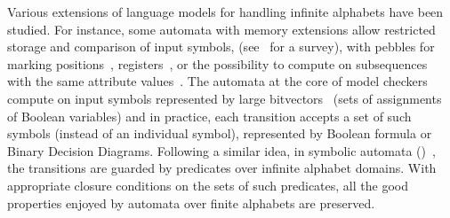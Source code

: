 Various extensions of language models for handling infinite alphabets have been studied.
For instance, some automata with memory extensions
allow restricted storage and comparison of input symbols,
(see~\cite{Segoufin06csl} for a survey),
with pebbles for marking positions~\cite{NevenSchwentickVianu04FSMinfinite},
registers~\cite{KaminskiFrancez94},
or %
the possibility to compute on subsequences
with the same attribute values~\cite{Bojanczyk11FO2}. %
%
%
The automata at the core of model checkers
compute on input symbols represented by large bitvectors~\cite{Vardi07ciaa} %
(sets of assignments of Boolean variables) %
and in practice,  %
each transition accepts a set of such symbols (instead of an individual symbol),
represented by Boolean formula or Binary Decision Diagrams.
%
Following a similar idea, %
in symbolic automata (\SA)~\cite{dAntoniVeanes17CAV,dAntoni21CACM},
the transitions are guarded by predicates over infinite alphabet domains.
With appropriate closure conditions on the sets of such predicates, %
all the good properties enjoyed by automata over finite alphabets are preserved.

